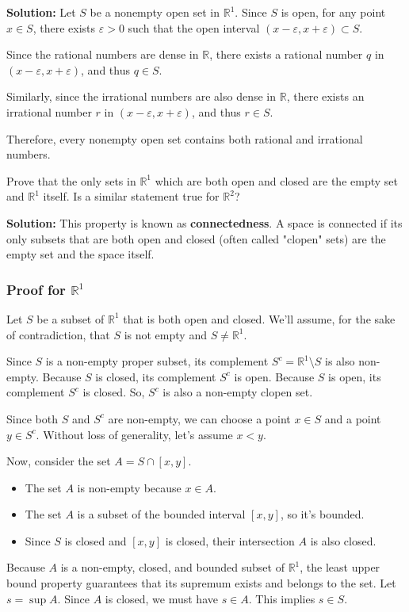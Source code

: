 \textbf{Solution:} Let $S$ be a nonempty open set in $\mathbb{R}^1$. Since $S$ is open, for any point $x \in S$, there exists $\varepsilon > 0$ such that the open interval $(x-\varepsilon, x+\varepsilon) \subset S$.

Since the rational numbers are dense in $\mathbb{R}$, there exists a rational number $q$ in $(x-\varepsilon, x+\varepsilon)$, and thus $q \in S$.

Similarly, since the irrational numbers are also dense in $\mathbb{R}$, there exists an irrational number $r$ in $(x-\varepsilon, x+\varepsilon)$, and thus $r \in S$.

Therefore, every nonempty open set contains both rational and irrational numbers.

\begin{problembox}
Prove that the only sets in $\mathbb{R}^1$ which are both open and closed are the empty set and $\mathbb{R}^1$ itself. Is a similar statement true for $\mathbb{R}^2$?
\end{problembox}

\textbf{Solution:}
This property is known as \textbf{connectedness}. A space is connected if its only subsets that are both open and closed (often called "clopen" sets) are the empty set and the space itself.

\subsubsection*{Proof for $\mathbb{R}^1$}
Let $S$ be a subset of $\mathbb{R}^1$ that is both open and closed. We'll assume, for the sake of contradiction, that $S$ is not empty and $S \neq \mathbb{R}^1$.

Since $S$ is a non-empty proper subset, its complement $S^c = \mathbb{R}^1 \setminus S$ is also non-empty. Because $S$ is closed, its complement $S^c$ is open. Because $S$ is open, its complement $S^c$ is closed. So, $S^c$ is also a non-empty clopen set.

Since both $S$ and $S^c$ are non-empty, we can choose a point $x \in S$ and a point $y \in S^c$. Without loss of generality, let's assume $x < y$.

Now, consider the set $A = S \cap [x, y]$.
\begin{itemize}
    \item The set $A$ is non-empty because $x \in A$.
    \item The set $A$ is a subset of the bounded interval $[x,y]$, so it's bounded.
    \item Since $S$ is closed and $[x, y]$ is closed, their intersection $A$ is also closed.
\end{itemize}
Because $A$ is a non-empty, closed, and bounded subset of $\mathbb{R}^1$, the least upper bound property guarantees that its supremum exists and belongs to the set. Let $s = \sup A$. Since $A$ is closed, we must have $s \in A$. This implies $s \in S$.

